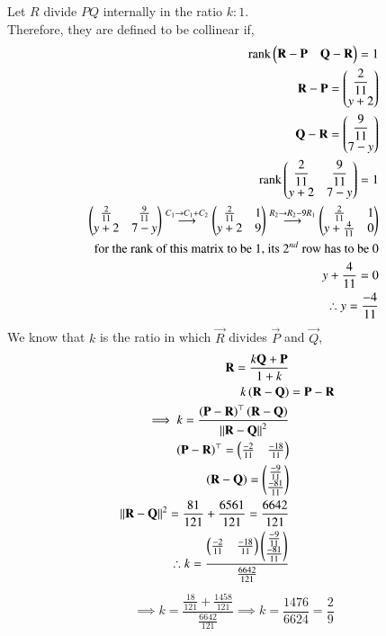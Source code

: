 \documentclass[journal,12pt,onecolumn]{IEEEtran}
\theoremstyle{remark}
\begin{document}
Let $R$ divide $PQ$ internally in the ratio $k:1$.\\
Therefore, they are defined to be collinear if,
\begin{align*}
    \text{rank}\begin{pmatrix}\mathbf{R}- \mathbf{P} & \mathbf{Q}-\mathbf{R}\end{pmatrix}=1\\
    \mathbf{R}-\mathbf{P}=\begin{pmatrix}\dfrac{2}{11} \\ y+2\end{pmatrix}\\
    \mathbf{Q}-\mathbf{R}=\begin{pmatrix}\dfrac{9}{11} \\ 7-y\end{pmatrix}\\
    \text{rank}\begin{pmatrix}\dfrac{2}{11} & \dfrac{9}{11} \\ y+2 & 7-y\end{pmatrix} = 1\\
    \begin{pmatrix}\frac{2}{11}&\frac{9}{11}\\ y+2&7-y\end{pmatrix} \overset{C_1 \rightarrow C_1+C_2}{\longrightarrow} \begin{pmatrix}\frac{2}{11} &1 \\ y+2 & 9\end{pmatrix} \overset{R_2 \rightarrow R_2-9 R_1}{\longrightarrow} \begin{pmatrix}\frac{2}{11}&1\\ y+\frac{4}{11} & 0\end{pmatrix}\\
    \text{for the rank of this matrix to be 1, its $2^{nd}$ row has to be 0}\\ y+\frac{4}{11}=0\\
    \therefore y=\dfrac{-4}{11}
\end{align*}
We know that $k$ is the ratio in which $\vec{R}$ divides $\vec{P}$ and $\vec{Q}$,
\begin{align*}
   \mathbf{R}=\dfrac{k\mathbf{Q}+\mathbf{P}}{1+k}\\
   k\left(\mathbf{R}-\mathbf{Q}\right)&= \mathbf{P}-\mathbf{R}\\
   \implies k =\dfrac{\left(\mathbf{P}-\mathbf{R}\right)^{\top}\left(\mathbf{R}-\mathbf{Q}\right)}{\left\lVert\mathbf{R}-\mathbf{Q}\right\rVert^2}\\
   \left(\mathbf{P}-\mathbf{R}\right)^{\top}=\begin{pmatrix}\frac{-2}{11} & \frac{-18}{11}\end{pmatrix}\\
   \left(\mathbf{R}-\mathbf{Q}\right)=\begin{pmatrix}\frac{-9}{11} \\ \frac{-81}{11}\end{pmatrix}\\
   \left\lVert\mathbf{R}-\mathbf{Q}\right\rVert^2=\frac{81}{121} + \frac{6561}{121}=\frac{6642}{121}\\
   \therefore k=\dfrac{\begin{pmatrix}\frac{-2}{11} & \frac{-18}{11}\end{pmatrix}\begin{pmatrix}\frac{-9}{11} \\ \frac{-81}{11}\end{pmatrix}}{\frac{6642}{121}}\\
   \end{align*}
\begin{align*}
   \implies k=\dfrac{\frac{18}{121} + \frac{1458}{121}}{\frac{6642}{121}}
   \implies k=\dfrac{1476}{6624}=\dfrac{2}{9}
\end{align*}
\end{document}

